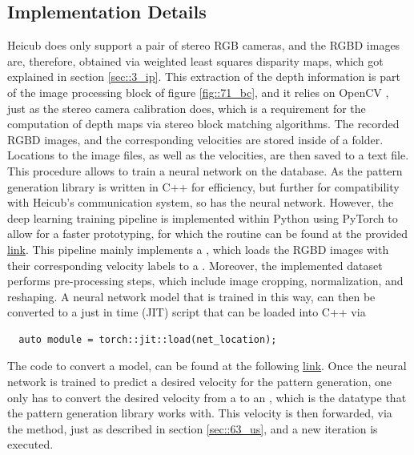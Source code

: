 \subsection{Implementation Details}
\label{sec::712_id}
Heicub does only support a pair of stereo RGB cameras, and the RGBD images are, therefore, obtained via weighted least squares disparity maps, which got explained in section \ref{sec::3_ip}. This extraction of the depth information is part of the image processing block of figure \ref{fig::71_bc}, and it relies on OpenCV \cite{opencv_library}, just as the stereo camera calibration does, which is a requirement for the computation of depth maps via stereo block matching algorithms. The recorded RGBD images, and the corresponding velocities are stored inside of a folder. Locations to the image files, as well as the velocities, are then saved to a text file. This procedure allows to train a neural network on the database. As the pattern generation library is written in C++ for efficiency, but further for compatibility with Heicub's communication system, so has the neural network. However, the deep learning training pipeline is implemented within Python using PyTorch \cite{paszke2017automatic} to allow for a faster prototyping, for which the routine can be found at the provided \href{https://github.com/mhubii/nmpc_pattern_generator/blob/master/libs/learning/python/train_rgbd.py}{\underline{link}}. This pipeline mainly implements a , which loads the RGBD images with their corresponding velocity labels to a . Moreover, the implemented dataset performs pre-processing steps, which include image cropping, normalization, and reshaping. A neural network model that is trained in this way, can then be converted to a just in time (JIT) script that can be loaded into C++ via
\begin{verbatim}
  auto module = torch::jit::load(net_location);
\end{verbatim}
The code to convert a model, can be found at the following \href{https://github.com/mhubii/nmpc_pattern_generator/blob/master/libs/learning/python/python_to_cpp.py}{\underline{link}}. Once the neural network is trained to predict a desired velocity for the pattern generation, one only has to convert the desired velocity from a  to an , which is the datatype that the pattern generation library works with. This velocity is then forwarded, via the  method, just as described in section \ref{sec::63_us}, and a new iteration is executed.